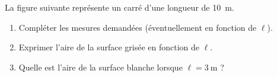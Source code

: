 
\begin{exercice}\label{exo2smath-0008}

    La figure suivante représente un carré d'une longueur de \SI{10}{\meter}.
\begin{center}

\end{center}

    \begin{enumerate}
        \item
            Compléter les mesures demandées (éventuellement en fonction de \( \ell\)).
        \item
            Exprimer l'aire de la surface grisée en fonction de \( \ell\).
        \item
            Quelle est l'aire de la surface blanche lorsque \( \ell=\SI{3}{\meter}\) ?
    \end{enumerate}


\end{exercice}
